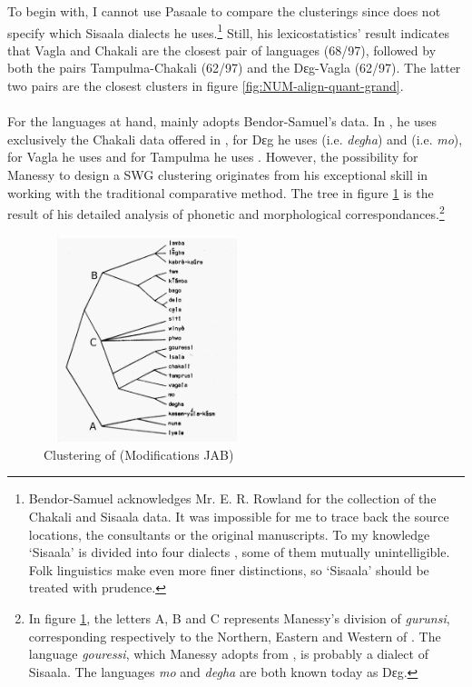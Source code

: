 To begin with, I cannot use Pasaale to compare the clusterings since
\citeauthor{Bend65} does not
specify which Sisaala dialects
he uses.\footnote{Bendor-Samuel
acknowledges Mr. E. R. Rowland for the collection of the Chakali and Sisaala
data. It was impossible for me to trace back  the source locations, the
consultants or the original manuscripts.
To my knowledge `Sisaala'
is  divided into four dialects \citep{Lewi09}, some of them mutually
unintelligible.  Folk linguistics make
even
more finer distinctions,  so `Sisaala'  should be treated with prudence.}
Still, 
his lexicostatistics' result
indicates that Vagla and Chakali are the closest pair of languages (68/97),
followed by both the pairs Tampulma-Chakali (62/97) and the Dɛg-Vagla (62/97).
The
latter two pairs are the closest clusters in  figure
\ref{fig:NUM-align-quant-grand}.



\paragraph{\cite{Mane69a}}
\label{sec:NUM-mane69a}

For the languages
at hand,  \citeauthor{Mane69a} mainly adopts Bendor-Samuel's data. In 
\citet[16-18]{Mane69a}, he uses exclusively the Chakali data offered in
\cite{Bend65},  for
Dɛg he uses
\cite{Dela04} (i.e. {\it degha}) and \cite{Bend65} (i.e. {\it mo}), for Vagla he
uses
\cite{Ratt32a, Crou66, Bend65} and for Tampulma he uses   \cite{Ratt32a,
Bend65}. However, the possibility for Manessy to design a SWG clustering
originates from his exceptional skill in working with the traditional
comparative method. The tree in figure \ref{fig:Mane-clust} is the result of his
detailed  analysis of phonetic and
morphological correspondances.\footnote{In figure  \ref{fig:Mane-clust},
the letters A, B and C represents Manessy's division of {\it gurunsi},
corresponding respectively to the Northern, Eastern and  Western of 
\cite{Nade89}. The
language {\it gouressi}, which Manessy adopts from \cite{Dela04}, is probably a
dialect of Sisaala. The languages {\it mo} and {\it degha} are both known 
today as Dɛg. }



 \begin{figure}[htb]
 \centering
 \includegraphics[width=6cm, height=6cm]{Graphic/Pictures/File-0002NEW.jpg}
\caption[Clustering of 
 Manessy]{Clustering of 
\citet[86]{Mane69b} (Modifications JAB)\label{fig:Mane-clust}}
\end{figure}



